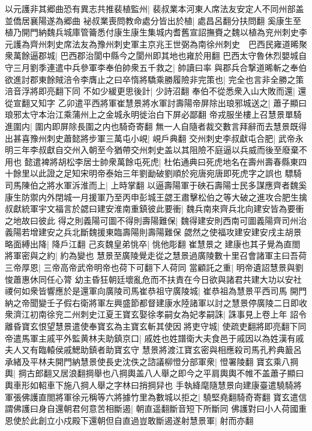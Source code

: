 以元護非其郷曲恐有異志共推裴植監州|{
	裴叔業本河東人席法友安定人不同州部盖並僑居襄陽遂為郷曲}
袐叔業喪問教命處分皆出於植|{
	處昌呂翻分扶問翻}
奚康生至植乃開門納魏兵城庫管籥悉付康生康生集城内耆舊宣詔撫賚之魏以植為兖州刺史李元護為齊州刺史席法友為豫州刺史軍主京兆王世弼為南徐州刺史　巴西民雍道晞聚衆萬餘逼郡城|{
	巴西郡治閬中縣今之閬州即其地也雍於用翻}
巴西太守魯休烈嬰城自守三月劉季連遣中兵參軍李奉伯帥衆五千救之|{
	帥讀曰率}
與郡兵合撃道晞斬之奉伯欲進討郡東餘賊涪令李膺止之曰卒惰將驕乘勝履險非完策也|{
	完全也言非全勝之策涪音浮將即亮翻下同}
不如少緩更思後計|{
	少詩沼翻}
奉伯不從悉衆入山大敗而還|{
	還從宣翻又知字}
乙卯遣平西將軍崔慧景將水軍討壽陽帝屏除出琅邪城送之|{
	蕭子顯曰琅邪太守本治江乘蒲州上之金城永明徙治白下屏必鄙翻}
帝戎服坐樓上召慧景單騎進圍内|{
	圍内即屏除長圍之内也騎奇寄翻}
無一人自隨者裁交數言拜辭而去慧景既得出甚喜豫州刺史蕭懿將步軍三萬屯小峴|{
	峴戶典翻}
交州刺史李叔獻屯合肥|{
	武帝永明三年李叔獻自交州入朝至今猶帶交州刺史盖以其阻險不庭逼以兵威而後至廢棄不用也}
懿遣裨將胡松李居士帥衆萬餘屯死虎|{
	杜佑通典曰死虎地名在壽州壽春縣東四十餘里以此證之足知宋明帝泰始三年劉勔破劉順於宛唐宛唐即死虎字之誤也}
驃騎司馬陳伯之將水軍泝淮而上|{
	上時掌翻}
以逼壽陽軍于硤石壽陽士民多謀應齊者魏奚康生防禦内外閉城一月援軍乃至丙申彭城王勰王肅擊松伯之等大破之進攻合肥生擒叔獻統軍宇文福言於勰曰建安淮南重鎮彼此要衝|{
	魏兵南來齊兵北向建安皆為要衝之地故曰彼此}
得之則義陽可圖不得則壽陽難保|{
	魏得建安則西南可圖義陽齊司州治義陽若增建安之兵北斷魏援東臨壽陽則壽陽難保}
勰然之使福攻建安建安戌主胡景略面縛出降|{
	降戶江翻}
己亥魏皇弟恌卒|{
	恌他彫翻}
崔慧景之建康也其子覺為直閤將軍密與之約|{
	約為變也}
慧景至廣陵覺走從之慧景過廣陵數十里召會諸軍主曰吾荷三帝厚恩|{
	三帝高帝武帝明帝也荷下可翻下人荷同}
當顧託之重|{
	明帝遺詔慧景與劉悛蕭惠休同任心膂}
幼主昏狂朝廷壞亂危而不扶責在今日欲與諸君共建大功以安社禝何如衆皆響應於是還軍向廣陵司馬崔恭祖守廣陵城|{
	崔恭祖為慧景平西司馬}
開門納之帝聞變壬子假右衛將軍左興盛節都督建康水陸諸軍以討之慧景停廣陵二日即收衆濟江初南徐兖二州刺史江夏王寶玄娶徐孝嗣女為妃孝嗣誅|{
	誅事見上卷上年}
詔令離昏寶玄恨望慧景遣使奉寶玄為主寶玄斬其使因將吏守城|{
	使疏吏翻將即亮翻下同}
帝遣馬軍主戚平外監黄林夫助鎮京口|{
	戚姓也姓譜衛大夫食邑于戚因以為姓漢有戚夫人又有臨轅侯戚鰓助鎮者助寶玄守}
慧景將渡江寶玄密與相應殺司馬孔矜典籖呂承緒及平林夫開門納慧景使長史沈佚之諮議柳憕分部軍衆|{
	憕署陵翻}
寶玄乘八掆輿|{
	掆古郎翻又居浪翻掆舉也八掆輿盖八人舉之即今之平肩輿輿不帷不盖蕭子顯曰輿車形如軺車下施八掆人舉之字林曰捎掆舁也}
手執絳麾隨慧景向建康臺遣驍騎將軍張佛護直閤將軍徐元稱等六將據竹里為數城以拒之|{
	驍堅堯翻騎奇寄翻}
寶玄遣信謂佛護曰身自還朝君何意苦相斷遏|{
	朝直遥翻斷音短下所斷同}
佛護對曰小人荷國重恩使於此創立小戍殿下還朝但自直過豈敢斷遏遂射慧景軍|{
	射而亦翻}
